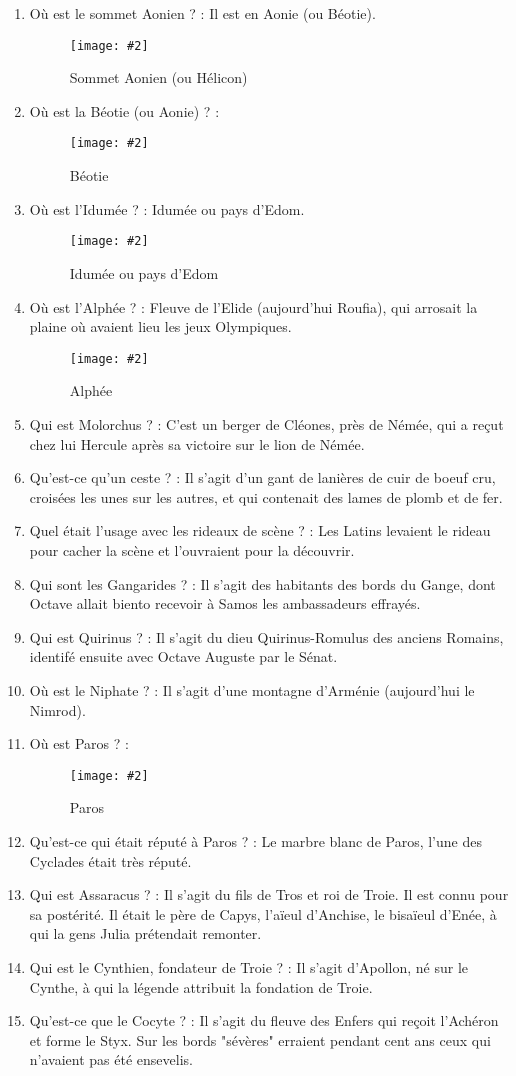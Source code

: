\documentclass[a4paper, 11pt, hidelinks]{article}
\newcommand{\img}[4]{\begin{figure}[!ht]
    \centering
    \texttt{[image: \#2]}
    \caption{#3}
    \label{#4}
    \end{figure} }
\begin{document}
\begin{enumerate}
      \item Où est le sommet Aonien ? : Il est en Aonie (ou Béotie).
            \img{0.4}{Aonien.png}{Sommet Aonien (ou Hélicon)}{111}
            \newpage
      \item Où est la Béotie (ou Aonie) ? :
            \img{0.5}{Béotie.png}{Béotie}{112}
      \item Où est l'Idumée ? : Idumée ou pays d'Edom.
            \img{0.5}{Idumée.png}{Idumée ou pays d'Edom}{113}
      \item Où est l'Alphée ? : Fleuve de l'Elide (aujourd'hui Roufia), qui arrosait la plaine où avaient lieu les jeux Olympiques.
            \img{0.5}{Alphée.png}{Alphée}{114}
            \newpage
      \item Qui est Molorchus ? : C'est un berger de Cléones, près de Némée, qui a reçut chez lui Hercule après sa victoire sur le lion de Némée.
      \item Qu'est-ce qu'un ceste ? : Il s'agit d'un gant de lanières de cuir de boeuf cru, croisées les unes sur les autres, et qui contenait des lames de plomb et de fer.
      \item Quel était l'usage avec les rideaux de scène ? : Les Latins levaient le rideau pour cacher la scène et l'ouvraient pour la découvrir.
      \item Qui sont les Gangarides ? : Il s'agit des habitants des bords du Gange, dont Octave allait biento recevoir à Samos les ambassadeurs effrayés.
      \item Qui est Quirinus ? : Il s'agit du dieu Quirinus-Romulus des anciens Romains, identifé ensuite avec Octave Auguste par le Sénat.
      \item Où est le Niphate ? : Il s'agit d'une montagne d'Arménie (aujourd'hui le Nimrod).
      \item Où est Paros ? :
            \img{0.4}{Paros.png}{Paros}{115}
      \item Qu'est-ce qui était réputé à Paros ? : Le marbre blanc de Paros, l'une des Cyclades était très réputé.
      \item Qui est Assaracus ? : Il s'agit du fils de Tros et roi de Troie. Il est connu pour sa postérité. Il était le père de Capys, l'aïeul d'Anchise, le bisaïeul d'Enée, à qui
            la gens Julia prétendait remonter.
      \item Qui est le Cynthien, fondateur de Troie ? : Il s'agit d'Apollon, né sur le Cynthe, à qui la légende attribuit la fondation de Troie.
      \item Qu'est-ce que le Cocyte ? : Il s'agit du fleuve des Enfers qui reçoit l'Achéron et forme le Styx. Sur les bords "sévères" erraient pendant cent ans ceux qui n'avaient pas été ensevelis.

\end{enumerate}
\end{document}
